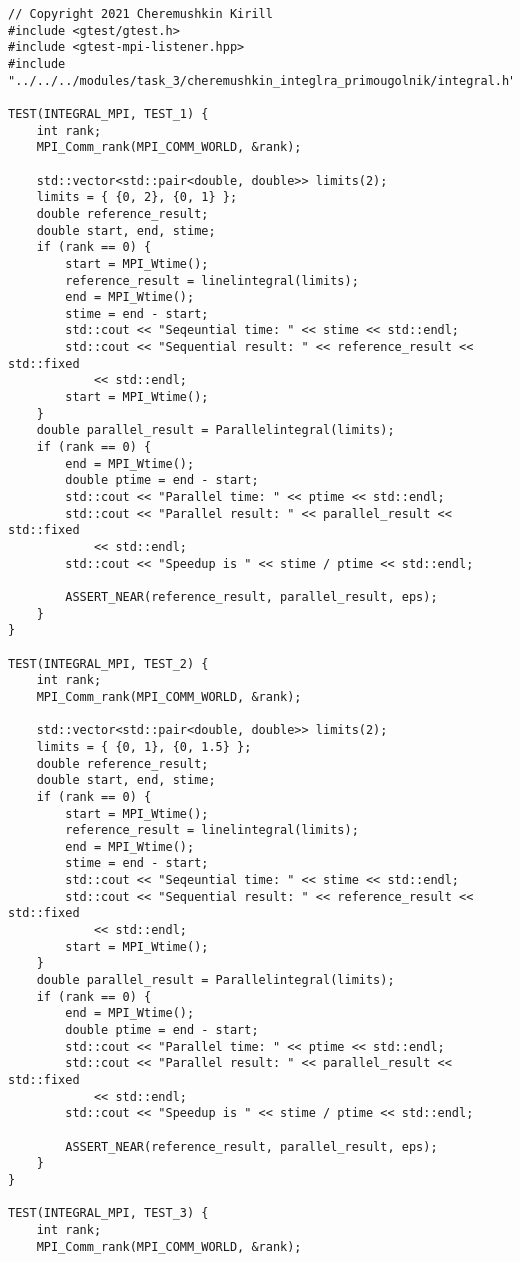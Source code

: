 \documentclass{report}
\begin{document}
\begin{lstlisting}
// Copyright 2021 Cheremushkin Kirill
#include <gtest/gtest.h>
#include <gtest-mpi-listener.hpp>
#include "../../../modules/task_3/cheremushkin_integlra_primougolnik/integral.h"

TEST(INTEGRAL_MPI, TEST_1) {
    int rank;
    MPI_Comm_rank(MPI_COMM_WORLD, &rank);

    std::vector<std::pair<double, double>> limits(2);
    limits = { {0, 2}, {0, 1} };
    double reference_result;
    double start, end, stime;
    if (rank == 0) {
        start = MPI_Wtime();
        reference_result = linelintegral(limits);
        end = MPI_Wtime();
        stime = end - start;
        std::cout << "Seqeuntial time: " << stime << std::endl;
        std::cout << "Sequential result: " << reference_result << std::fixed
            << std::endl;
        start = MPI_Wtime();
    }
    double parallel_result = Parallelintegral(limits);
    if (rank == 0) {
        end = MPI_Wtime();
        double ptime = end - start;
        std::cout << "Parallel time: " << ptime << std::endl;
        std::cout << "Parallel result: " << parallel_result << std::fixed
            << std::endl;
        std::cout << "Speedup is " << stime / ptime << std::endl;

        ASSERT_NEAR(reference_result, parallel_result, eps);
    }
}

TEST(INTEGRAL_MPI, TEST_2) {
    int rank;
    MPI_Comm_rank(MPI_COMM_WORLD, &rank);

    std::vector<std::pair<double, double>> limits(2);
    limits = { {0, 1}, {0, 1.5} };
    double reference_result;
    double start, end, stime;
    if (rank == 0) {
        start = MPI_Wtime();
        reference_result = linelintegral(limits);
        end = MPI_Wtime();
        stime = end - start;
        std::cout << "Seqeuntial time: " << stime << std::endl;
        std::cout << "Sequential result: " << reference_result << std::fixed
            << std::endl;
        start = MPI_Wtime();
    }
    double parallel_result = Parallelintegral(limits);
    if (rank == 0) {
        end = MPI_Wtime();
        double ptime = end - start;
        std::cout << "Parallel time: " << ptime << std::endl;
        std::cout << "Parallel result: " << parallel_result << std::fixed
            << std::endl;
        std::cout << "Speedup is " << stime / ptime << std::endl;

        ASSERT_NEAR(reference_result, parallel_result, eps);
    }
}

TEST(INTEGRAL_MPI, TEST_3) {
    int rank;
    MPI_Comm_rank(MPI_COMM_WORLD, &rank);


\end{lstlisting}
\end{document}
